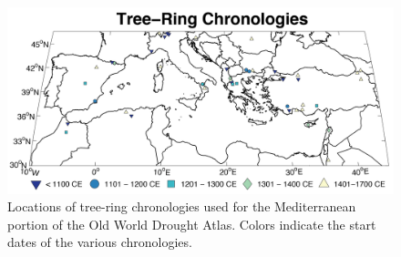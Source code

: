 \documentclass[draft,jgr]{AGUTeX}
\begin{document}

%
%
%
%
%
%


\newpage

\begin{figure}
\center
\includegraphics[width=1.0\columnwidth]{fig_01_map_sites.png}
\caption{Locations of tree-ring chronologies used for the Mediterranean portion of the Old World Drought Atlas. Colors indicate the start dates of the various chronologies.}\label{placeholder}
\end{figure}
\end{document}
